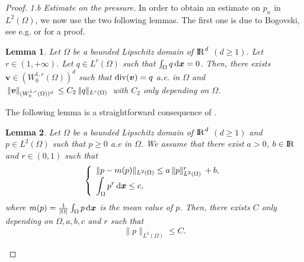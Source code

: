 \documentclass{amsart}
\newtheorem{lm}{Lemma}
\numberwithin{equation}{section}
\begin{document}
\begin{proof}
\medskip
{\it  1.b Estimate on the pressure.} 
In order to obtain an estimate on $p_n$ in $L^2(\Omega)$, we now use the two following lemmas. The first one is due to Bogovski,  see e.g. \cite[Section 3.3]{straskraba2004introduction} or \cite[Theorem 10.1]{feireisl2009singular} for a proof.

\begin{lm}
Let $\Omega$ be a bounded Lipschitz domain of ${\ifmmode{\rm	I\mkern-3.1mu
R\mkern1mu}\else{\rm I\kern-.18em 
R\hskip1pt\	}\fi\relax}^d$ $ (d\ge1)$.
Let $r \in (1,+\infty)$.
Let $q \in L^{r}(\Omega)$ such that $\int_{\Omega} q{\, {\rm d}{{\boldsymbol x}}} =0$. Then, there exists ${\bm{v}}  \in (W^{1,r}_0(\Omega))^d$ such that ${{\rm div}} ({\bm{v}}) =q$ a.e. in $\Omega$ and ${\hspace{.2em}|\hspace{-.1em}| {\bm{v}} |\hspace{-.1em}|_{{(W^{1,r}_0(\Omega))^d}}\hspace{.2em}}  \le C_2 {\hspace{.2em}|\hspace{-.1em}| {q} |\hspace{-.1em}|_{{L^{r}(\Omega)}}\hspace{.2em}}$ with $C_2$ only depending on $\Omega$.
\label{lem:bogos}
\end{lm}

The following lemma is a straightforward consequence of \cite[Lemma 5.4]{fettah2014existence}.

\begin{lm}\label{estl2} 
Let $\Omega$ be a bounded Lipschitz domain of ${\ifmmode{\rm	I\mkern-3.1mu
R\mkern1mu}\else{\rm I\kern-.18em 
R\hskip1pt\	}\fi\relax}^d$ $ (d\ge1)$  and $p \in L^2(\Omega) $ such that  $p \ge 0 $ a.e in $\Omega$.
We assume that there exist $a > 0$, $b \in {\ifmmode{\rm	I\mkern-3.1mu
R\mkern1mu}\else{\rm I\kern-.18em 
R\hskip1pt\	}\fi\relax}$ and $ r \in (0,1)$ such that
\begin{equation*}
\left\{
\begin{array}{l}
  \| p -m(p) \|_{L^2(\Omega)} \le a {\hspace{.2em}|\hspace{-.1em}| {p} |\hspace{-.1em}|^{{r}}_{{L^2(\Omega)}}\hspace{.2em}} + b,
  \\ \displaystyle
  \int_\Omega p^r {\, {\rm d}{{\boldsymbol x}}} \le c,
\end{array}
\right.
\end{equation*}
where $m(p)=\frac{1}{|\Omega|} \int_\Omega p {\, {\rm d}{{\boldsymbol x}}}$ is the mean value of $p$. Then, there exists $C$ only depending on $\Omega, a, b, c$ and $r$ such that 
\begin{equation*} \| p \|_{L^2(\Omega)} \le C.
\end{equation*}
\end{lm}


\end{proof}
\end{document}
